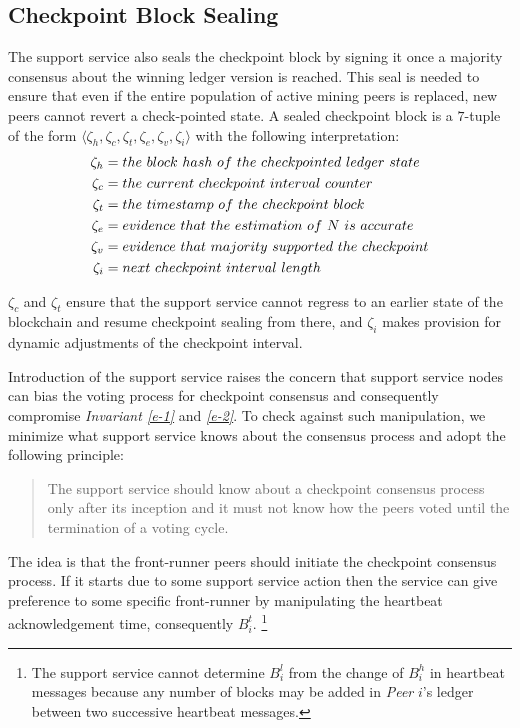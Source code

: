 \subsection{Checkpoint Block Sealing}
The support service also seals the checkpoint block by signing it once a majority consensus about the winning ledger version is reached. This seal is needed to ensure that even if the entire population of active mining peers is replaced, new peers cannot revert a check-pointed state. A sealed checkpoint block is a $7$-tuple of the form $\langle \zeta_h, \zeta_c, \zeta_t, \zeta_e, \zeta_v, \zeta_i \rangle$ with the following interpretation:
\begin{equation*}
\begin{split}
	\zeta_h & = the\ block\ hash\ of\ the\ check\-pointed\ ledger\ state \\
	\zeta_c & = the\ current\ checkpoint\ interval\ counter \\
	\zeta_t & = the\ timestamp\ of\ the\ checkpoint\ block \\
	\zeta_e & = evidence\ that\ the\ estimation\ of\ N\ is\ accurate \\
	\zeta_v & = evidence\ that\ majority\ supported\ the\ checkpoint \\
	\zeta_i & = next\ checkpoint\ interval\ length
\end{split}
\end{equation*}

$\zeta_c$ and $\zeta_t$ ensure that the support service cannot regress to an earlier state of the blockchain and resume checkpoint sealing from there, and $\zeta_i$ makes provision for dynamic adjustments of the checkpoint interval.

Introduction of the support service raises the concern that support service nodes can bias the voting process for checkpoint consensus and consequently compromise \textit{Invariant \ref{e-1}} and \textit{\ref{e-2}}. To check against such manipulation, we minimize what support service knows about the consensus process and adopt the following principle:

\begin{quote}
The support service should know about a checkpoint consensus process only after its inception and it must not know how the peers voted until the termination of a voting cycle.         
\end{quote}

The idea is that the front-runner peers should initiate the checkpoint consensus process. If it starts due to some support service action then the service can give preference to some specific front-runner by manipulating the heartbeat acknowledgement time, consequently $B_i^t$. \footnote{The support service cannot determine $B_i^l$ from the change of $B_i^h$ in heartbeat messages because any number of blocks may be added in \textit{Peer} $i$'s ledger between two successive heartbeat messages.}

